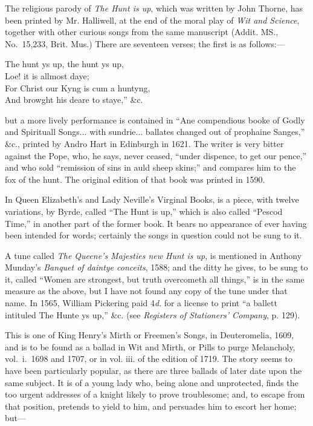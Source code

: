The religious parody of \textit{The Hunt is up}, which was written by John Thorne,
has been printed by Mr. Halliwell, at the end of the moral play of \textit{Wit and
Science}, together with other curious songs from the same manuscript (Addit. MS.,
No.~15,233, Brit. Mus.) There are seventeen verses; the first is as follows:—

\settowidth{\versewidth}{“The hunt ys up, the hunt ys up,}
\begin{scverse}
\begin{altverse}
The hunt ys up, the hunt ys up,\\
Loe! it is allmost daye;\\
For Christ our Kyng is cum a huntyng,\\
And browght his deare to staye,” \&c.
\end{altverse}
\end{scverse}
but a more lively performance is contained in “Ane compendious booke of Godly
and Spirituall Songs... with sundrie... ballates changed out of prophaine
Sanges,” \&c., printed by Andro Hart in Edinburgh in 1621. The writer is very
bitter against the Pope, who, he says, never ceased, “under dispence, to get our
pence,” and who sold “remission of sins in auld sheep skins;” and compares
him to the fox of the hunt. The original edition of that book was printed in 1590.

In Queen Elizabeth’s and Lady Neville’s Virginal Books, is a piece, with twelve
variations, by Byrde, called “The Hunt is up,” which is also called “Pescod
Time,” in another part of the former book. It bears no appearance of ever having
been intended for words; certainly the songs in question could not be sung
to it.

A tune called \textit{The Queene’s Majesties new Hunt is up}, is mentioned in Anthony
Munday’s \textit{Banquet of daintye conceits}, 1588; and the ditty he gives, to be sung
to it, called “Women are strongest, but truth overcometh all things,” is in the
same measure as the above, but I have not found any copy of the tune under that
name. In 1565, William Pickering paid 4\textit{d}. for a license to print “a ballett
intituled The Hunte ys up,” \&c. (see \textit{Registers of Stationers’ Company}, p. 129).


This is one of King Henry’s Mirth or Freemen’s Songs, in Deutero\-melia, 1609,
and is to be found as a ballad in Wit and Mirth, or Pills to purge Melancholy,
vol.~i.~1698 and 1707, or in vol. iii. of the edition of 1719. The story seems to
have been particularly popular, as there are three ballads of later date upon the
same subject. It is of a young lady who, being alone and unprotected, finds the
too urgent addresses of a knight likely to prove troublesome; and, to escape
from that position, pretends to yield to him, and persuades him to escort her
home; but—

